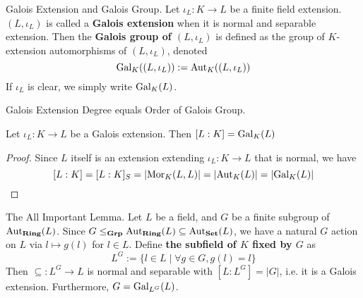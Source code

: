 \documentclass[../book.tex]{subfiles}
\begin{document}
\begin{dfn} Galois Extension and Galois Group.
    Let $\iota_L : K \to L$ be a finite field extension. 
    $(L,\iota_L)$ is called a \textbf{Galois extension} when 
    it is normal and separable extension.
    Then the \textbf{Galois group of $(L,\iota_L)$} is defined as 
    the group of $K$-extension automorphisms of $(L,\iota_L)$, denoted
    \[ \text{Gal}_{K}((L,\iota_L)) := \text{Aut}_{K}((L,\iota_L)) \]
    If $\iota_L$ is clear, we simply write $\text{Gal}_{K}(L)$. 
\end{dfn}
\begin{thm} Galois Extension Degree equals Order of Galois Group.
    
    Let $\iota_L : K \to L$ be a Galois extension. 
    Then $[L : K] = \text{Gal}_{K}(L)$
\end{thm}
\begin{proof}
    Since $L$ itself is an extension extending $\iota_L : K \to L$ that is normal,
    we have \[
        [L : K] = [L : K]_S = |\text{Mor}_{K}(L, L)| = |\text{Aut}_{K}(L)| = |\text{Gal}_{K}(L)|
    \]
\end{proof}
\begin{lem} The All Important Lemma.
    Let $L$ be a field, and $G$ be a finite subgroup of $\text{Aut}_{\mathbf{Ring}}(L)$. 
    Since $G \leq_{\mathbf{Grp}} \text{Aut}_{\mathbf{Ring}}(L) \subseteq \text{Aut}_{\mathbf{Set}}(L)$, 
    we have a natural $G$ action on $L$ via $l \mapsto g(l)$ for $l \in L$. 
    Define \textbf{the subfield of $K$ fixed by $G$} as
    \[ L^G := \{l \in L \mid \forall g \in G, g(l)=l\} \]
    Then $\subseteq : L^G \to L$ is normal and separable with $[L:L^G] = |G|$,
    i.e. it is a Galois extension. 
    Furthermore, $G = \text{Gal}_{L^G}(L)$.
\end{lem}
\end{document}
